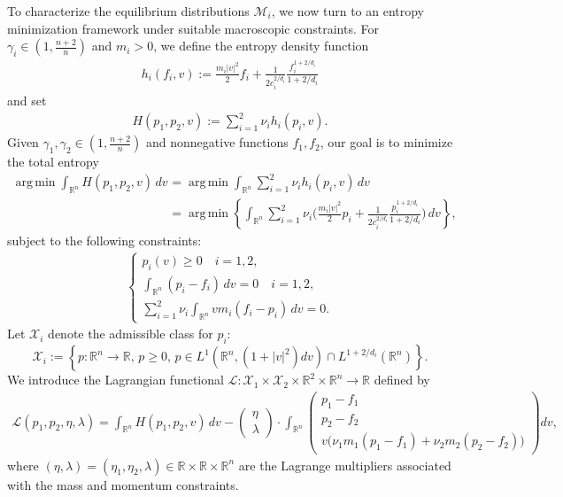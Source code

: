 \documentclass[10pt,reqno]{amsart}
\numberwithin{equation}{section}
\newcommand{\R}{\mathbb R}
\newcommand{\lt}{\left}
\newcommand{\rt}{\right}
\newcommand{\calX}{\mathcal X}
\newcommand{\calL}{\mathcal L}
\DeclareMathOperator*{\argmin}{arg\,min}
\begin{document}
To characterize the equilibrium distributions $\mathcal{M}_i$, we now turn to an entropy minimization framework under suitable macroscopic constraints. For $\gamma_i \in \left(1,\frac{n+2}{n}\right)$ and $m_i>0$, we define the entropy density function 
\begin{align} \label{eq: def: h}
    h_{i}(f_i, v) := \frac{m_i|v|^2}{2}f_i + \frac{1}{2c_i^{2/d_i}} \frac{f_i^{1+2/d_i}}{1+2/d_i}
\end{align}
and set
\begin{align*}
    H(p_1,p_2,v) := \sum_{i=1}^2 \nu_i  h_i(p_i, v).
\end{align*}
Given $\gamma_1, \gamma_2 \in \left(1,\frac{n+2}{n}\right)$ and nonnegative functions $f_1, f_2$, our goal is to minimize the total entropy 
\[%
\begin{split}
    \argmin \int_{\R^n} H(p_1,p_2,v)\,dv &= \argmin \int_{\R^n} \sum_{i=1}^2 \nu_i h_{i}(p_i, v)\, dv  \\
    &= \argmin \left\{\int_{\R^n} \sum_{i=1}^2 \nu_i \Big(\frac{m_i|v|^2}{2}p_i + \frac{1}{2c_i^{2/d_i}} \frac{p_i^{1+2/d_i}}{1+2/d_i} \Big) \, dv\right\},
    \end{split}
\]%
subject to the following constraints:
\begin{align}
\label{eq: constraints}
    \begin{cases}
        p_i(v) \ge 0 \quad i=1,2,\\[2mm]
       \displaystyle  \int_{\R^n} (p_i - f_i) \,dv= 0 \quad i=1,2,\\[2.5mm]
       \displaystyle   \sum_{i=1}^2  \nu_i \int_{\R^n} v  m_i(f_i - p_i) \,dv = 0.
    \end{cases}
\end{align}
Let $\mathcal{X}_i$ denote the admissible class for  $p_i$:
\[%
    \calX_i := \lt\{p:\R^n \to \R, \, p\ge 0, \, p\in L^1(\R^n,(1+|v|^2)dv) \cap L^{1+2/d_i}(\R^n) \rt\}.
\]%
We introduce the Lagrangian functional $\calL:\calX_1 \times \calX_2 \times\R^2\times\R^n \to \R$ defined by
\begin{align*}
    \calL(p_1,p_2,\eta,\lambda) = \int_{\R^n} H(p_1,p_2,v) \,dv - \begin{pmatrix} \eta \\ \lambda \end{pmatrix} \cdot \int_{\R^n} \begin{pmatrix} p_1 - f_1 \\ p_2 - f_2 \\ v\Big( \nu_1 m_1(p_1-f_1) + \nu_2 m_2(p_2 - f_2) \Big) \end{pmatrix} dv,
\end{align*}
where $(\eta,\lambda) = (\eta_1,\eta_2,\lambda)\in \R \times \R \times \R^n$ are the Lagrange multipliers associated with the mass and momentum constraints. 
\end{document}
